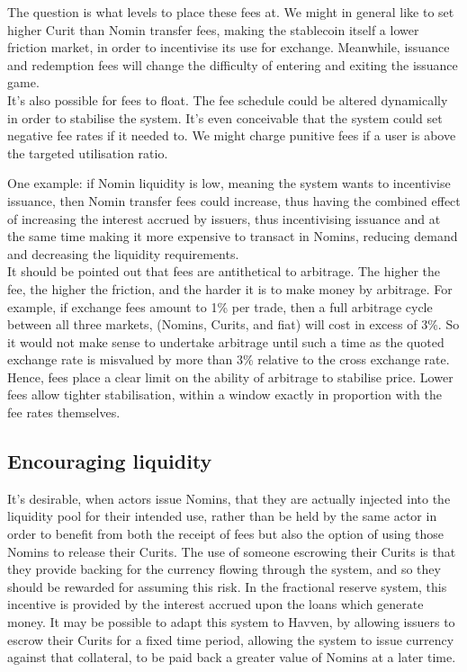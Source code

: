 The question is what levels to place these fees at. We might in general like to set higher Curit than Nomin transfer fees, making the stablecoin itself a lower friction market, in order to incentivise its use for exchange. Meanwhile, issuance and redemption fees will change the difficulty of entering and exiting the issuance game. \\

It's also possible for fees to float. The fee schedule could be altered dynamically in order to stabilise the system. It's even conceivable that the system could set negative fee rates if it needed to. We might charge punitive fees if a user is above the targeted utilisation ratio.

One example: if Nomin liquidity is low, meaning the system wants to incentivise issuance, then Nomin transfer fees could increase, thus having the combined effect of increasing the interest accrued by issuers, thus incentivising issuance and at the same time making it more expensive to transact in Nomins,
reducing demand and decreasing the liquidity requirements. \\

It should be pointed out that fees are antithetical to arbitrage. The higher the fee, the higher the friction, and the harder it is to make money by arbitrage. For example, if exchange fees amount to 1\% per trade, then a full arbitrage cycle between all three markets, (Nomins, Curits, and fiat) will cost in excess of 3\%. So it would not make sense to undertake arbitrage until such a time as the quoted exchange rate is misvalued by more than 3\% relative to the cross exchange rate. Hence, fees place a clear limit on the ability of arbitrage to stabilise price. Lower fees allow tighter stabilisation, within a window exactly in proportion with the fee rates themselves.


\pagebreak
\subsection{Encouraging liquidity}

\noindent It's desirable, when actors issue Nomins, that they are actually injected into the liquidity pool for their intended use, rather than be held by the same actor in order to benefit from both the receipt of fees but also the option of using those Nomins to release their Curits. The use of someone escrowing their Curits is that they provide backing for the currency flowing through the system, and so they should be rewarded for assuming this risk. In the fractional reserve system, this incentive is provided by the interest accrued upon the loans which generate money. It may be possible to adapt this system to Havven, by allowing issuers to escrow their Curits for a fixed time period, allowing the system to issue currency against that collateral, to be paid back a greater value of Nomins at a later time. \\

